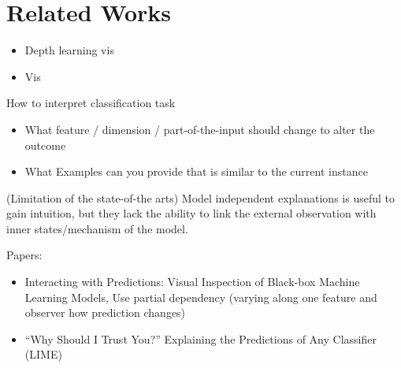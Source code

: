 \section{Related Works}

\begin{itemize}
    \item Depth learning vis
    \item Vis
\end{itemize}

How to interpret classification task
\begin{itemize}
    \item What feature / dimension / part-of-the-input should change to
    alter the outcome
    \item What Examples can you provide that is similar to the current
    instance

\end{itemize}

(Limitation of the state-of-the arts)
Model independent explanations is useful to gain intuition, but they lack the ability to link the external observation with inner states/mechanism of the model.


Papers:
\begin{itemize}
    \item Interacting with Predictions: Visual Inspection of Black-box Machine Learning Models,
    Use partial dependency (varying along one feature and observer how prediction changes)
    \item “Why Should I Trust You?” Explaining the Predictions of Any Classifier (LIME)

\end{itemize}
